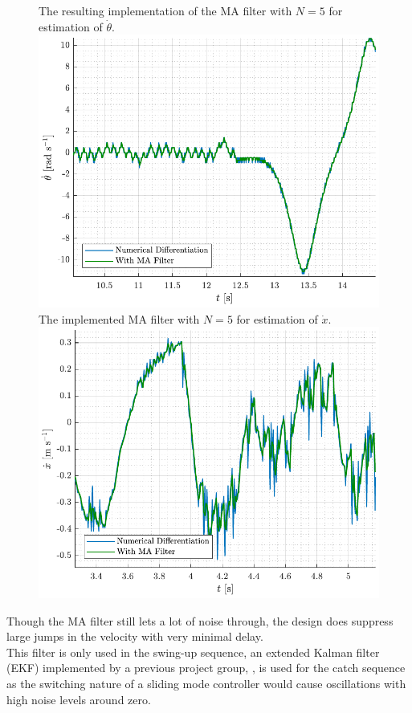 \begin{figure}[H]
  \hspace{1cm}
  \captionbox
  {
    The resulting implementation of the MA filter with $N=5$ for estimation of $\dot{\theta}$.
    \label{fig:thetaDotMA_test}
  }
  {
    \hspace{-1cm}
    \includegraphics[width=.45\textwidth]{figures/thetaDotMA_test}
  }
  \hspace{20pt}
  \captionbox 
  {
    The implemented MA filter with $N=5$ for estimation of $\dot{x}$.
    \label{fig:xDotMA_test}
  }
  {
    \hspace{-1cm}
    \includegraphics[width=.45\textwidth]{figures/xDotMA_test}
  }  
\end{figure}
%
Though the MA filter still lets a lot of noise through, the design does suppress large jumps in the velocity with very minimal delay.\\
This filter is only used in the swing-up sequence, an extended Kalman filter (EKF) implemented by a previous project group, \cite{JHHorgensen}, is used for the catch sequence as the switching nature of a sliding mode controller would cause oscillations with high noise levels around zero.